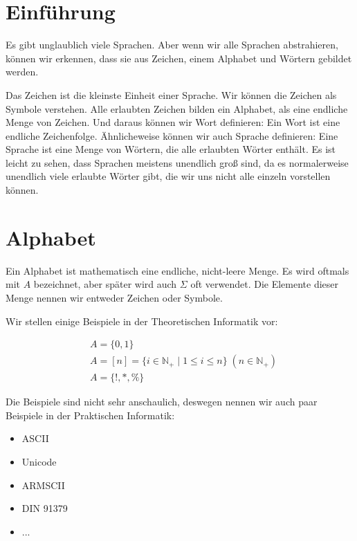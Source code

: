 \documentclass[12pt,a4paper,oneside]{article}
\newcommand{\emptyline}{\hspace*{\fill}}
\newcommand{\N}{\mathbb{N}}
\begin{document}
    \tableofcontents

    \newpage

    \section{Einführung}

        Es gibt unglaublich viele Sprachen.
        Aber wenn wir alle Sprachen abstrahieren, können wir erkennen, dass sie aus Zeichen, einem Alphabet und Wörtern gebildet werden.

        \emptyline

        Das Zeichen ist die kleinste Einheit einer Sprache.
        Wir können die Zeichen als Symbole verstehen.
        Alle erlaubten Zeichen bilden ein Alphabet, als eine endliche Menge von Zeichen.
        Und daraus können wir Wort definieren: Ein Wort ist eine endliche Zeichenfolge.
        Ähnlicheweise können wir auch Sprache definieren: Eine Sprache ist eine Menge von Wörtern, die alle erlaubten Wörter enthält.
        Es ist leicht zu sehen, dass Sprachen meistens unendlich groß sind, da es normalerweise unendlich viele erlaubte Wörter gibt,
        die wir uns nicht alle einzeln vorstellen können.

    \section{Alphabet}

        Ein Alphabet ist mathematisch eine endliche, nicht-leere Menge.
        Es wird oftmals mit $A$ bezeichnet, aber später wird auch $\Sigma$ oft verwendet.
        Die Elemente dieser Menge nennen wir entweder Zeichen oder Symbole.

        \emptyline

        Wir stellen einige Beispiele in der Theoretischen Informatik vor:

        \vspace{-1em}
        \begin{align*}
            &A = \{0, 1\} \\
            &A = [n] = \{i \in \N_+ \;|\; 1 \leq i \leq n\} \; (n \in \N_+) \\
            &A = \{!, *, \%\}
        \end{align*}

        Die Beispiele sind nicht sehr anschaulich, deswegen nennen wir auch paar Beispiele in der Praktischen Informatik:

        \begin{itemize}
            \item ASCII
            \item Unicode
            \item ARMSCII
            \item DIN 91379
            \item ...
        \end{itemize}
\end{document}
